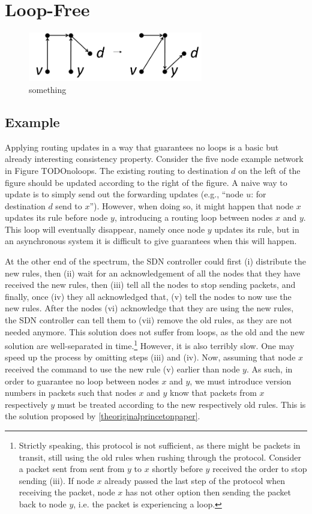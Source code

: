 \section{Loop-Free}
\label{sec:example}

\begin{figure}[t!]
\includegraphics[width=3in]{figures/noloops.png}
\caption{something}
\end{figure}

\subsection{Example}

Applying routing updates in a way that guarantees no loops is a basic but already interesting consistency property. Consider the five node example network in Figure TODOnoloops. The existing routing to destination $d$ on the left of the figure should be updated according to the right of the figure. A naive way to update is to simply send out the forwarding updates (e.g., ``node $u$: for destination $d$ send to $x$''). However, when doing so, it might happen that node $x$ updates its rule before node $y$, introducing a routing loop between nodes $x$ and $y$. This loop will eventually disappear, namely once node $y$ updates its rule, but in an asynchronous system it is difficult to give guarantees when this will happen.

At the other end of the spectrum, the SDN controller could first (i) distribute the new rules, then (ii) wait for an acknowledgement of all the nodes that they have received the new rules, then (iii) tell all the nodes to stop sending packets, and finally, once (iv) they all acknowledged that, (v) tell the nodes to now use the new rules. After the nodes (vi) acknowledge that they are using the new rules, the SDN controller can tell them to (vii) remove the old rules, as they are not needed anymore. This solution does not suffer from loops, as the old and the new solution are well-separated in time.\footnote{Strictly speaking, this protocol is not sufficient, as there might be packets in transit, still using the old rules when rushing through the protocol. Consider a packet sent from sent from $y$ to $x$ shortly before $y$ received the order to stop sending (iii). If node $x$ already passed the last step of the protocol when receiving the packet, node $x$ has not other option then sending the packet back to node $y$, i.e. the packet is experiencing a loop.} However, it is also terribly slow. One may speed up the process by omitting steps (iii) and (iv). Now, assuming that node $x$ received the command to use the new rule (v) earlier than node $y$. As such, in order to guarantee no loop between nodes $x$ and $y$, we must introduce version numbers in packets such that nodes $x$ and $y$ know that packets from $x$ respectively $y$ must be treated according to the new respectively old rules. This is the solution proposed by \ref{theoriginalprincetonpaper}.

